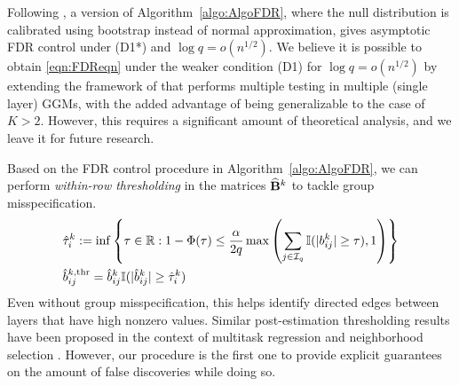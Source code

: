 \begin{Remark}
Following \cite{LiuShao14}, a version of Algorithm~\ref{algo:AlgoFDR}, where the null distribution is calibrated using bootstrap instead of normal approximation, gives asymptotic FDR control under (D1*) and $\log q = o(n^{1/2})$. We believe it is possible to obtain \eqref{eqn:FDReqn} under the weaker condition (D1) for $ \log q = o(n^{1/2})$ by extending the framework of \cite{Liu17} that performs multiple testing in multiple (single layer) GGMs, with the added advantage of being generalizable to the case of $K > 2$. However, this requires a significant amount of theoretical analysis, and we leave it for future research.
\end{Remark}

\begin{Remark}
Based on the FDR control procedure in Algorithm~\ref{algo:AlgoFDR}, we can perform {\it within-row thresholding} in the matrices $\widehat {{\mathbf{B}}}^k$ to tackle group misspecification.
%
\begin{align}
& \hat \tau_i^k := \inf \left\{\tau \in {\mathbb{R}}: 1 - \Phi(\tau) \leq \frac{\alpha}{2 q}
\max \left( \sum_{j \in {\cal{I}}_q} {\mathbb{I}}( |b_{ij}^k| \geq \tau), 1 \right) \right\} \notag\\
& \hat b_{ij}^{k, \text{thr}} =  \hat b_{ij}^k {\mathbb{I}} ( |\hat b_{ij}^k| \geq \hat \tau_i^k)
\label{eqn:fdr-threshold}
\end{align}
%
Even without group misspecification, this helps identify directed edges between layers that have high nonzero values. Similar post-estimation thresholding results have been proposed in the context of multitask regression \citep{ObozinskiEtal11,MajumdarChatterjeeStat} and neighborhood selection \citep{MaMichailidis15}. However, our procedure is the first one to provide explicit guarantees on the amount of false discoveries while doing so.
\end{Remark}